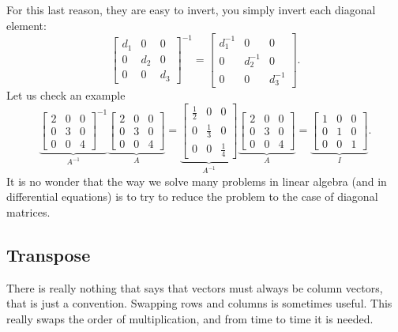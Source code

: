 For this last reason, they are easy to invert, you simply invert
each diagonal element:
\begin{equation*}
\begin{bmatrix}
d_1 & 0 & 0 \\
0 & d_2 & 0 \\
0 & 0 & d_3 
\end{bmatrix}^{-1}
=
\begin{bmatrix}
d_1^{-1} & 0 & 0 \\
0 & d_2^{-1} & 0 \\
0 & 0 & d_3^{-1} 
\end{bmatrix} .
\end{equation*}
Let us check an example
\begin{equation*}
\underbrace{
\begin{bmatrix}
2 & 0 & 0 \\
0 & 3 & 0 \\
0 & 0 & 4 
\end{bmatrix}^{-1}
}_{A^{-1}}
\underbrace{
\begin{bmatrix}
2 & 0 & 0 \\
0 & 3 & 0 \\
0 & 0 & 4 
\end{bmatrix}
}_{A}
=
\underbrace{
\begin{bmatrix}
\frac{1}{2} & 0 & 0 \\
0 & \frac{1}{3} & 0 \\
0 & 0 & \frac{1}{4} 
\end{bmatrix}
}_{A^{-1}}
\underbrace{
\begin{bmatrix}
2 & 0 & 0 \\
0 & 3 & 0 \\
0 & 0 & 4 
\end{bmatrix}
}_{A}
=
\underbrace{
\begin{bmatrix}
1 & 0 & 0 \\
0 & 1 & 0 \\
0 & 0 & 1 
\end{bmatrix}
}_{I} .
\end{equation*}
It is no wonder that the way we solve many problems in linear algebra
(and in differential equations) is to try to reduce the problem to the
case of diagonal matrices.

\subsection{Transpose}

There is really nothing that says that vectors must always be column
vectors, that is just a convention.
Swapping rows and columns is sometimes useful.  This really swaps 
the order of multiplication, and from time to time it is needed.

